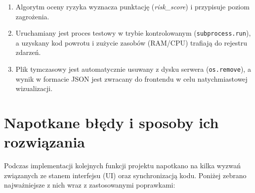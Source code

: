 \documentclass{article}
\begin{document}
\begin{itemize}
\begin{enumerate}
\item Algorytm oceny ryzyka wyznacza punktację (\textit{risk\_score}) i przypisuje poziom zagrożenia.
\item Uruchamiany jest proces testowy w trybie kontrolowanym (\texttt{subprocess.run}), a uzyskany kod powrotu i zużycie zasobów (RAM/CPU) trafiają do rejestru zdarzeń.
\item Plik tymczasowy jest automatycznie usuwany z dysku serwera (\texttt{os.remove}), a wynik w formacie JSON jest zwracany do frontendu w celu natychmiastowej wizualizacji.
\end{enumerate}
\end{itemize}

\section{Napotkane błędy i sposoby ich rozwiązania}
\label{sec:bledy}
Podczas implementacji kolejnych funkcji projektu napotkano na kilka wyzwań związanych ze stanem interfejsu (UI) oraz synchronizacją kodu. Poniżej zebrano najważniejsze z nich wraz z zastosowanymi poprawkami:
\end{document}
